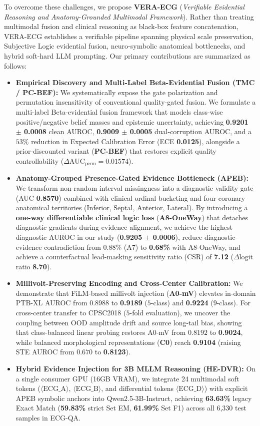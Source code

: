 \documentclass[preprint,12pt]{elsarticle}
\begin{document}
To overcome these challenges, we propose \textbf{VERA-ECG} (\emph{Verifiable Evidential Reasoning and Anatomy-Grounded Multimodal Framework}). Rather than treating multimodal fusion and clinical reasoning as black-box feature concatenation, VERA-ECG establishes a verifiable pipeline spanning physical scale preservation, Subjective Logic evidential fusion, neuro-symbolic anatomical bottlenecks, and hybrid soft-hard LLM prompting. Our primary contributions are summarized as follows:

\begin{itemize}
    \item \textbf{Empirical Discovery and Multi-Label Beta-Evidential Fusion (TMC / PC-BEF):} We systematically expose the gate polarization and permutation insensitivity of conventional quality-gated fusion. We formulate a multi-label Beta-evidential fusion framework that models class-wise positive/negative belief masses and epistemic uncertainty, achieving \textbf{0.9201 $\pm$ 0.0008} clean AUROC, \textbf{0.9009 $\pm$ 0.0005} dual-corruption AUROC, and a $53\%$ reduction in Expected Calibration Error (ECE \textbf{0.0125}), alongside a prior-discounted variant (\textbf{PC-BEF}) that restores explicit quality controllability ($\Delta\text{AUC}_{\text{perm}} = 0.01574$).
    \item \textbf{Anatomy-Grouped Presence-Gated Evidence Bottleneck (APEB):} We transform non-random interval missingness into a diagnostic validity gate (AUC \textbf{0.8570}) combined with clinical ordinal bucketing and four coronary anatomical territories (Inferior, Septal, Anterior, Lateral). By introducing a \textbf{one-way differentiable clinical logic loss} (\textbf{A8-OneWay}) that detaches diagnostic gradients during evidence alignment, we achieve the highest diagnostic AUROC in our study (\textbf{0.9205 $\pm$ 0.0006}), reduce diagnostic--evidence contradiction from $0.88\%$ (A7) to \textbf{0.68\%} with A8-OneWay, and achieve a counterfactual lead-masking sensitivity ratio (CSR) of \textbf{7.12} ($\Delta\text{logit}$ ratio \textbf{8.70}).
    \item \textbf{Millivolt-Preserving Encoding and Cross-Center Calibration:} We demonstrate that FiLM-based millivolt injection (\textbf{A0-mV}) elevates in-domain PTB-XL AUROC from $0.8988$ to \textbf{0.9189} ($5$-class) and \textbf{0.9224} ($9$-class). For cross-center transfer to CPSC2018 ($5$-fold evaluation), we uncover the coupling between OOD amplitude drift and source long-tail bias, showing that class-balanced linear probing restores A0-mV from $0.8192$ to \textbf{0.9024}, while balanced morphological representations (\textbf{C0}) reach \textbf{0.9104} (raising STE AUROC from $0.670$ to \textbf{0.8123}).
    \item \textbf{Hybrid Evidence Injection for 3B MLLM Reasoning (HE-DVR):} On a single consumer GPU (16GB VRAM), we integrate 24 multimodal soft tokens ($\langle\text{ECG\_A}\rangle$, $\langle\text{ECG\_B}\rangle$, and differential tokens $\langle\text{ECG\_D}\rangle$) with explicit APEB symbolic anchors into Qwen2.5-3B-Instruct, achieving \textbf{63.63\%} legacy Exact Match (\textbf{59.83\%} strict Set EM, \textbf{61.99\%} Set F1) across all 6,330 test samples in ECG-QA.
\end{itemize}
\end{document}
